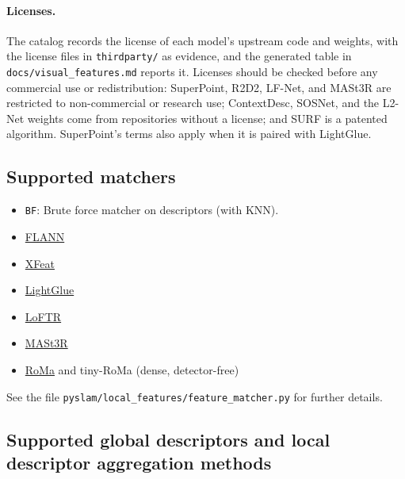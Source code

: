 \documentclass{article}
\let\oldparagraph\paragraph
\renewcommand{\paragraph}[1]{\oldparagraph{#1}\mbox{}}
\begin{document}
\paragraph{Licenses.} The catalog records the license of each model's upstream code and weights, with the license files in \texttt{thirdparty/} as evidence, and the generated table in \texttt{docs/visual\_features.md} reports it. Licenses should be checked before any commercial use or redistribution: SuperPoint, R2D2, LF-Net, and MASt3R are restricted to non-commercial or research use; ContextDesc, SOSNet, and the L2-Net weights come from repositories without a license; and SURF is a patented algorithm. SuperPoint's terms also apply when it is paired with LightGlue.

\hypertarget{supported-matchers}{%
\subsection{Supported matchers}\label{supported-matchers}}

\begin{itemize}
    \item \texttt{BF}: Brute force matcher on descriptors (with KNN).
    \item \href{https://www.semanticscholar.org/paper/Fast-Approximate-Nearest-Neighbors-with-Automatic-Muja-Lowe/35d81066cb1369acf4b6c5117fcbb862be2af350}{FLANN} \cite{muja2009fast}
    \item \href{https://arxiv.org/abs/2404.19174}{XFeat} \cite{barroso2024xfeat}
    \item \href{https://arxiv.org/abs/2306.13643}{LightGlue} \cite{lindenberger2023lightglue}
    \item \href{https://arxiv.org/abs/2104.00680}{LoFTR} \cite{sun2021loftr}
    \item \href{https://arxiv.org/abs/2406.09756}{MASt3R} \cite{master}
    \item \href{https://github.com/Parskatt/RoMa}{RoMa} and tiny-RoMa \cite{edstedt2024roma} (dense, detector-free)
\end{itemize}

See the file \texttt{pyslam/local\_features/feature\_matcher.py} for further
details.

\hypertarget{supported-global-descriptors-and-local-descriptor-aggregation-methods}{%
\subsection{Supported global descriptors and local descriptor
aggregation
methods}\label{supported-global-descriptors-and-local-descriptor-aggregation-methods}}
\end{document}
